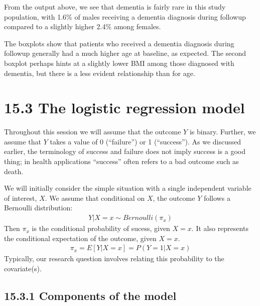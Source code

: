 \documentclass[letterpaper,10pt,english]{jupyterBook}
\begin{document}
\sphinxAtStartPar
From the output above, we see that dementia is fairly rare in this study population, with 1.6\% of males receiving a dementia diagnosis during follow\sphinxhyphen{}up compared to a slightly higher 2.4\% among females.

\sphinxAtStartPar
The box\sphinxhyphen{}plots show that patients who received a dementia diagnosis during follow\sphinxhyphen{}up generally had a much higher age at baseline, as expected. The second box\sphinxhyphen{}plot perhaps hints at a slightly lower BMI among those diagnosed with dementia, but there is a less evident relationship than for age.


\section{15.3 The logistic regression model}
\label{\detokenize{15.d. Logistic Regression:the-logistic-regression-model}}\label{\detokenize{15.d. Logistic Regression::doc}}
\sphinxAtStartPar
Throughout this session we will assume that the outcome \(Y\) is binary. Further, we assume that \(Y\) takes a value of 0 (“failure”) or 1 (“success”). As we discussed earlier, the terminology of success and failure does not imply success is a good thing; in health applications “success” often refers to a bad outcome such as death.

\sphinxAtStartPar
We will initially consider the simple situation with a single independent variable of interest, \(X\). We assume that conditional on \(X\), the outcome \(Y\) follows a Bernoulli distribution:
\begin{equation*}
\begin{split}
Y | X=x \sim Bernoulli(\pi_x)
\end{split}
\end{equation*}
\sphinxAtStartPar
Then \(\pi_x\) is the conditional probability of sucess, given \(X=x\). It also represents the conditional expectation of the outcome, given \(X=x\).
\begin{equation*}
\begin{split}
\pi_x = E[Y | X=x] = P(Y=1 | X=x)
\end{split}
\end{equation*}
\sphinxAtStartPar
Typically, our research question involves relating this probability to the covariate(s).


\subsection{15.3.1 Components of the model}
\label{\detokenize{15.d. Logistic Regression:components-of-the-model}}
\end{document}
